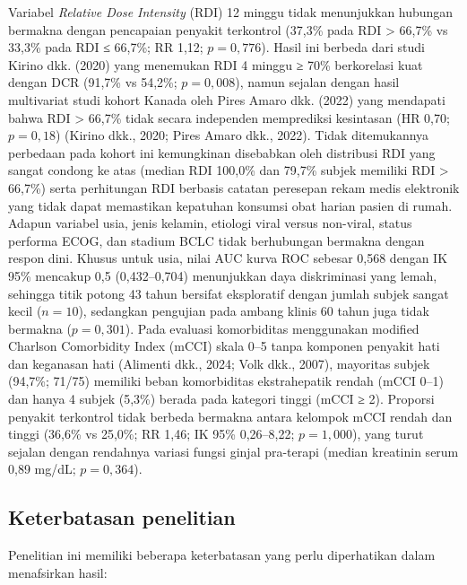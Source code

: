 \documentclass[
  indonesian,
]{report}
\begin{document}
Variabel \emph{Relative Dose Intensity} (RDI) 12 minggu tidak
menunjukkan hubungan bermakna dengan pencapaian penyakit terkontrol
(37,3\% pada RDI \textgreater{} 66,7\% vs 33,3\% pada RDI ≤ 66,7\%; RR
1,12; \(p = 0,776\)). Hasil ini berbeda dari studi Kirino dkk. (2020)
yang menemukan RDI 4 minggu ≥ 70\% berkorelasi kuat dengan DCR (91,7\%
vs 54,2\%; \(p = 0,008\)), namun sejalan dengan hasil multivariat studi
kohort Kanada oleh Pires Amaro dkk. (2022) yang mendapati bahwa RDI
\textgreater{} 66,7\% tidak secara independen memprediksi kesintasan (HR
0,70; \(p = 0,18\)) (Kirino dkk., 2020; Pires Amaro dkk., 2022). Tidak
ditemukannya perbedaan pada kohort ini kemungkinan disebabkan oleh
distribusi RDI yang sangat condong ke atas (median RDI 100,0\% dan
79,7\% subjek memiliki RDI \textgreater{} 66,7\%) serta perhitungan RDI
berbasis catatan peresepan rekam medis elektronik yang tidak dapat
memastikan kepatuhan konsumsi obat harian pasien di rumah. Adapun
variabel usia, jenis kelamin, etiologi viral versus non-viral, status
performa ECOG, dan stadium BCLC tidak berhubungan bermakna dengan respon
dini. Khusus untuk usia, nilai AUC kurva ROC sebesar 0,568 dengan IK
95\% mencakup 0,5 (0,432--0,704) menunjukkan daya diskriminasi yang
lemah, sehingga titik potong 43 tahun bersifat eksploratif dengan jumlah
subjek sangat kecil (\(n = 10\)), sedangkan pengujian pada ambang klinis
60 tahun juga tidak bermakna (\(p = 0,301\)). Pada evaluasi komorbiditas
menggunakan modified Charlson Comorbidity Index (mCCI) skala 0--5 tanpa
komponen penyakit hati dan keganasan hati (Alimenti dkk., 2024; Volk
dkk., 2007), mayoritas subjek (94,7\%; 71/75) memiliki beban
komorbiditas ekstrahepatik rendah (mCCI 0--1) dan hanya 4 subjek (5,3\%)
berada pada kategori tinggi (mCCI ≥ 2). Proporsi penyakit terkontrol
tidak berbeda bermakna antara kelompok mCCI rendah dan tinggi (36,6\% vs
25,0\%; RR 1,46; IK 95\% 0,26--8,22; \(p = 1,000\)), yang turut sejalan
dengan rendahnya variasi fungsi ginjal pra-terapi (median kreatinin
serum 0,89 mg/dL; \(p = 0,364\)).

\subsection{Keterbatasan penelitian}\label{keterbatasan-penelitian}

Penelitian ini memiliki beberapa keterbatasan yang perlu diperhatikan
dalam menafsirkan hasil:
\end{document}
